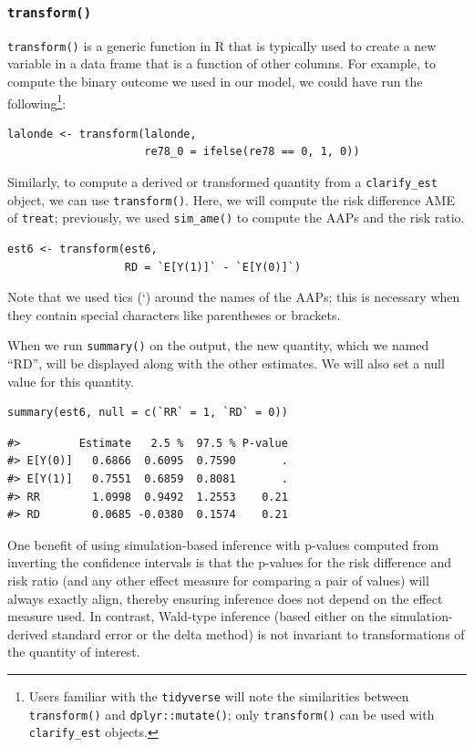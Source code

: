 \hypertarget{transform}{%
\subsubsection{\texorpdfstring{\texttt{transform()}}{transform()}}\label{transform}}

\texttt{transform()} is a generic function in R that is typically used to create a new variable in a data frame that is a function of other columns. For example, to compute the binary outcome we used in our model, we could have run the following\footnote{Users familiar with the \texttt{tidyverse} will note the similarities between \texttt{transform()} and \texttt{dplyr::mutate()}; only \texttt{transform()} can be used with \texttt{clarify\_est} objects.}:

\begin{verbatim}
lalonde <- transform(lalonde,
                     re78_0 = ifelse(re78 == 0, 1, 0))
\end{verbatim}

Similarly, to compute a derived or transformed quantity from a \texttt{clarify\_est} object, we can use \texttt{transform()}. Here, we will compute the risk difference AME of \texttt{treat}; previously, we used \texttt{sim\_ame()} to compute the AAPs and the risk ratio.

\begin{verbatim}
est6 <- transform(est6,
                  RD = `E[Y(1)]` - `E[Y(0)]`)
\end{verbatim}

Note that we used tics (`) around the names of the AAPs; this is necessary when they contain special characters like parentheses or brackets.

When we run \texttt{summary()} on the output, the new quantity, which we named ``RD'', will be displayed along with the other estimates. We will also set a null value for this quantity.

\begin{verbatim}
summary(est6, null = c(`RR` = 1, `RD` = 0))
\end{verbatim}

\begin{verbatim}
#>         Estimate   2.5 %  97.5 % P-value
#> E[Y(0)]   0.6866  0.6095  0.7590       .
#> E[Y(1)]   0.7551  0.6859  0.8081       .
#> RR        1.0998  0.9492  1.2553    0.21
#> RD        0.0685 -0.0380  0.1574    0.21
\end{verbatim}

One benefit of using simulation-based inference with p-values computed from inverting the confidence intervals is that the p-values for the risk difference and risk ratio (and any other effect measure for comparing a pair of values) will always exactly align, thereby ensuring inference does not depend on the effect measure used. In contrast, Wald-type inference (based either on the simulation-derived standard error or the delta method) is not invariant to transformations of the quantity of interest.

